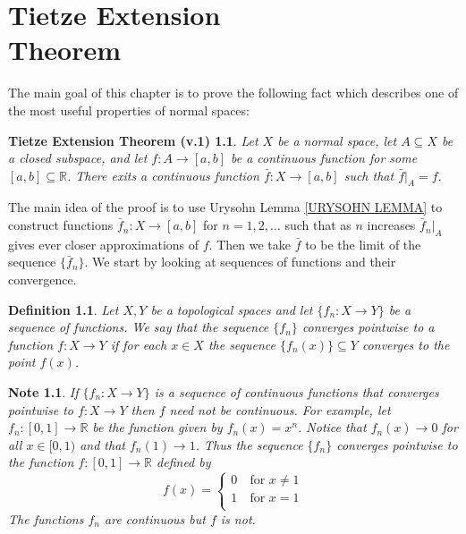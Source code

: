 \documentclass[11pt, letterpaper, oneside]{report}
\renewcommand{\chaptermark}[1]{\markboth{#1}{}}
\theoremstyle{pplain}
\newtheorem{TIETZE1}[theorem]{Tietze Extension Theorem (v.1)}
\newtheorem{ITERMVALUE THM}[theorem]{Intermediate Value Theorem}
\newtheorem{HEINEBOREL THM}[theorem]{Heine-Borel Theorem}
\newtheorem{UMETR THM}[theorem]{Urysohn Metrization Theorem}
\newtheorem{UMETR2 THM}[theorem]{Urysohn Metrization Theorem (v.2)}
\theoremstyle{ddefinition}
\newtheorem{definition}[theorem]{Definition}
\newtheorem{note}[theorem]{Note}
\theoremstyle{nnn}
\newtheorem{TDA NN}[theorem]{Topological Data Analysis. }
\theoremstyle{eexercise}
\newcommand{\R}{{\mathbb R}}
\begin{document}
 
\newpage

\chapter[Tietze Extension Theorem]{Tietze Extension \\ Theorem}
\chaptermark{Tietze Extension Theorem}

\thispagestyle{firststyle}

 
The main goal of this chapter is to prove the following fact which describes
one of the most useful properties of normal spaces: 

\begin{TIETZE1}
\label{TIETZE1 THM}
Let $X$ be a normal space, let $A\subseteq X$ be a closed subspace, and let 
$f\colon A\to [a, b]$ be a continuous function for some $[a, b]\subseteq \R$. 
There exits a continuous function $\bar{f}\colon X \to [a, b]$ such that $\bar{f}|_{A} = f$. 
\end{TIETZE1} 

The main idea of the proof is to use Urysohn Lemma \ref{URYSOHN LEMMA} to construct functions
$\bar{f}_{n}\colon X \to [a, b]$ for $n=1, 2, \dots$ such that as $n$ increases $\bar{f}_{n}|_{A}$ gives 
ever closer approximations of $f$. Then we  take $\bar{f}$ to be the limit of the sequence  
$\{\bar{f}_{n}\}$.  We  start by looking at sequences of functions and their convergence.  

\begin{definition}
Let $X, Y$ be a topological spaces and let $\{f_{n}\colon X\to Y\}$ be a sequence of functions. 
We say that the sequence $\{f_{n}\}$ \emph{converges pointwise} to a function $f\colon X\to Y$ 
if for each $x\in X$ the sequence  $\{f_{n}(x)\}\subseteq Y$ converges to the point $f(x)$. 
\end{definition}  
 
 
\begin{note}
If $\{f_{n}\colon X\to Y\}$ is a sequence of continuous functions that converges pointwise 
to $f\colon X\to Y$ then $f$ need not be continuous.  For example, let  
$f_{n}\colon [0, 1]\to \R$ be the function given by $f_{n}(x) = x^{n}$. Notice that 
 $f_{n}(x) \to 0$ for  all $x\in [0, 1)$ and that  $f_{n}(1) \to  1$. Thus the sequence $\{f_{n}\}$ converges
 pointwise to  the function $f\colon [0, 1]\to \R$ defined by
 $$
 f(x) = 
 \begin{cases}
 0 & \ \text{for } x\neq 1 \\
 1 & \ \text{for } x=1 \\
 \end{cases}
 $$
 The functions $f_{n}$ are continuous but $f$ is not. 
 \end{note}
 
\end{document}
